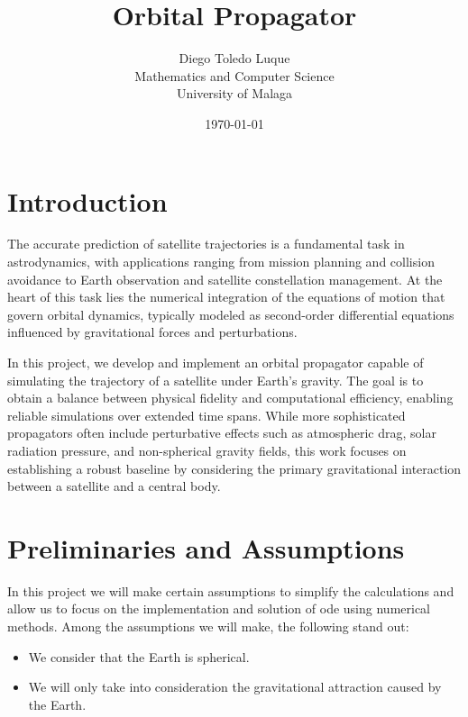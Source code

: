 \documentclass[12pt]{article}
\begin{document}
\title{Orbital Propagator}
\author{Diego Toledo Luque\\ %
Mathematics and Computer Science \\
University of Malaga}
\date{\today}
\maketitle

\section{Introduction}

The accurate prediction of satellite trajectories is a fundamental task in astrodynamics, with applications ranging from mission planning and collision avoidance to Earth observation and satellite constellation management. At the heart of this task lies the numerical integration of the equations of motion that govern orbital dynamics, typically modeled as second-order differential equations influenced by gravitational forces and perturbations.

In this project, we develop and implement an orbital propagator capable of simulating the trajectory of a satellite under Earth's gravity. The goal is to obtain a balance between physical fidelity and computational efficiency, enabling reliable simulations over extended time spans. While more sophisticated propagators often include perturbative effects such as atmospheric drag, solar radiation pressure, and non-spherical gravity fields, this work focuses on establishing a robust baseline by considering the primary gravitational interaction between a satellite and a central body.

\section{Preliminaries and Assumptions}

In this project we will make certain assumptions to simplify the calculations and allow us to focus on the implementation and solution of \gls{ode} using numerical methods. Among the assumptions we will make, the following stand out:

\begin{itemize}
    \item We consider that the Earth is spherical.
    \item We will only take into consideration the gravitational attraction caused by the Earth.
\end{itemize}
\end{document}
